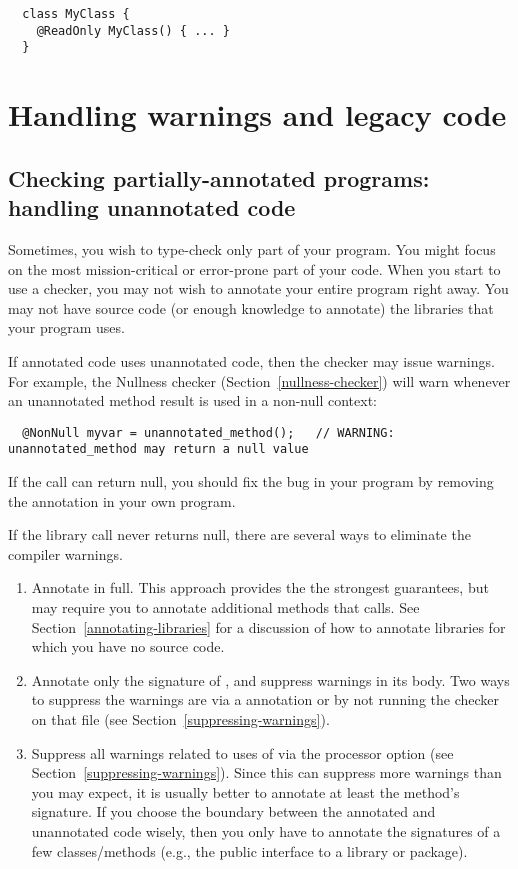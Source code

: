 \begin{Verbatim}
  class MyClass {
    @ReadOnly MyClass() { ... }
  }
\end{Verbatim}


\section{Handling warnings and legacy code\label{warnings-and-legacy}}


\subsection{Checking partially-annotated programs:  handling unannotated code\label{unannotated-code}}

Sometimes, you wish to type-check only part of your program.  
You might focus on the most mission-critical or error-prone part of your
code.  When you start to use a checker, you may not wish to annotate
your entire program right away.  You may not have source code (or
enough knowledge to annotate) the libraries that your program uses.

If annotated code uses unannotated code, then the checker may issue
warnings.  For example, the Nullness checker (Section~\ref{nullness-checker}) will
warn whenever an unannotated method result is used in a non-null context:

\begin{Verbatim}
  @NonNull myvar = unannotated_method();   // WARNING: unannotated_method may return a null value
\end{Verbatim}

If the call can return null, you should fix the bug in your program by
removing the  annotation in your own program.

If the library call never returns null,
there are several ways to eliminate the compiler warnings.
\begin{enumerate}
\item Annotate  in full.  This approach provides the
  the strongest guarantees, but may require you to annotate additional
  methods that  calls.  See
  Section~\ref{annotating-libraries} for a discussion of how to annotate
  libraries for which you have no source code.
\item Annotate only the signature of , and
  suppress warnings in its body.  Two ways to suppress the warnings are via a
   annotation or by not running the checker on that
  file (see Section~\ref{suppressing-warnings}).
\item Suppress all warnings related to uses of 
  via the  processor option
  (see Section~\ref{suppressing-warnings}).
  Since this can suppress more warnings than you may expect,
  it is usually better to annotate at least the method's signature.  If you
  choose the boundary between the annotated and unannotated code wisely,
  then you only have to annotate the signatures of a few classes/methods
  (e.g., the public interface to a library or package).
  
\end{enumerate}

